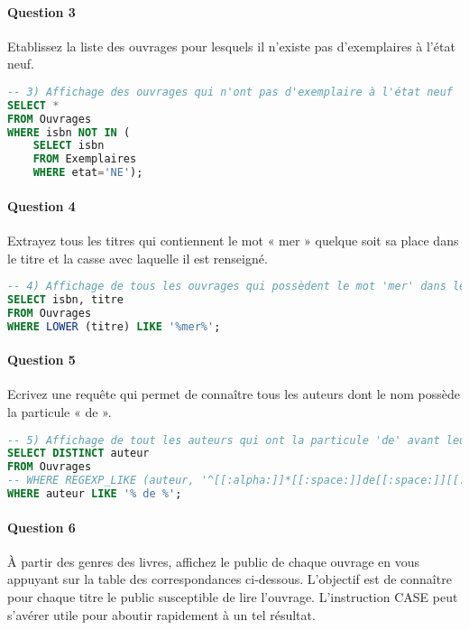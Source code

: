 \documentclass[10pt, oneside]{article}
\begin{document}

\paragraph{Question 3} Etablissez la liste des ouvrages pour lesquels il n'existe pas d'exemplaires à l'état neuf.

\begin{lstlisting}[language=sql, title=Question 3, label=QIII3]
-- 3) Affichage des ouvrages qui n'ont pas d'exemplaire à l'état neuf
SELECT *
FROM Ouvrages 
WHERE isbn NOT IN (
	SELECT isbn
	FROM Exemplaires
	WHERE etat='NE'); 
\end{lstlisting}


\paragraph{Question 4} Extrayez tous les titres qui contiennent le mot « mer » quelque soit sa place dans le titre et la casse avec laquelle il est renseigné.

\begin{lstlisting}[language=sql, title=Question 4, label=QIII4]
-- 4) Affichage de tous les ouvrages qui possèdent le mot 'mer' dans leur titre
SELECT isbn, titre
FROM Ouvrages 
WHERE LOWER (titre) LIKE '%mer%';
\end{lstlisting}


\paragraph{Question 5} Ecrivez une requête qui permet de connaître tous les auteurs dont le nom possède la particule « de ».

\begin{lstlisting}[language=sql, title=Question 5, label=QIII5]
-- 5) Affichage de tout les auteurs qui ont la particule 'de' avant leur nom de famille
SELECT DISTINCT auteur
FROM Ouvrages
-- WHERE REGEXP_LIKE (auteur, '^[[:alpha:]]*[[:space:]]de[[:space:]][[:alpha:]]+$'); -- Ne ressort qu'un seul nom sur les deux attendus
WHERE auteur LIKE '% de %';
\end{lstlisting}


\paragraph{Question 6} À partir des genres des livres, affichez le public de chaque ouvrage en vous appuyant sur la table des correspondances ci-dessous. L'objectif est de connaître pour chaque titre le public susceptible de lire l'ouvrage. L'instruction CASE peut s'avérer utile pour aboutir rapidement à un tel résultat.
\end{document}
